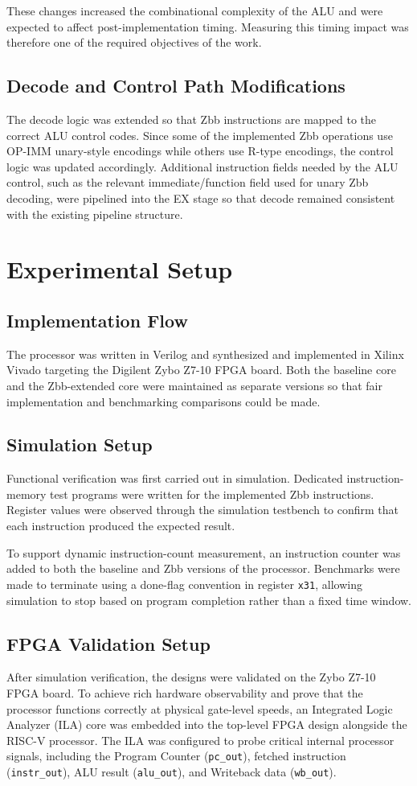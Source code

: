 \documentclass[conference]{IEEEtran}
\begin{document}
	These changes increased the combinational complexity of the ALU and were expected to affect post-implementation timing. Measuring this timing impact was therefore one of the required objectives of the work.
	
	\subsection{Decode and Control Path Modifications}
	The decode logic was extended so that Zbb instructions are mapped to the correct ALU control codes. Since some of the implemented Zbb operations use OP-IMM unary-style encodings while others use R-type encodings, the control logic was updated accordingly. Additional instruction fields needed by the ALU control, such as the relevant immediate/function field used for unary Zbb decoding, were pipelined into the EX stage so that decode remained consistent with the existing pipeline structure.
	
	\section{Experimental Setup}
	\subsection{Implementation Flow}
	The processor was written in Verilog and synthesized and implemented in Xilinx Vivado targeting the Digilent Zybo Z7-10 FPGA board. Both the baseline core and the Zbb-extended core were maintained as separate versions so that fair implementation and benchmarking comparisons could be made.
	
	\subsection{Simulation Setup}
	Functional verification was first carried out in simulation. Dedicated instruction-memory test programs were written for the implemented Zbb instructions. Register values were observed through the simulation testbench to confirm that each instruction produced the expected result.
	
	To support dynamic instruction-count measurement, an instruction counter was added to both the baseline and Zbb versions of the processor. Benchmarks were made to terminate using a done-flag convention in register \texttt{x31}, allowing simulation to stop based on program completion rather than a fixed time window.
	
	\subsection{FPGA Validation Setup}
	After simulation verification, the designs were validated on the Zybo Z7-10 FPGA board. To achieve rich hardware observability and prove that the processor functions correctly at physical gate-level speeds, an Integrated Logic Analyzer (ILA) core was embedded into the top-level FPGA design alongside the RISC-V processor. The ILA was configured to probe critical internal processor signals, including the Program Counter (\texttt{pc\_out}), fetched instruction (\texttt{instr\_out}), ALU result (\texttt{alu\_out}), and Writeback data (\texttt{wb\_out}).
	
\end{document}
